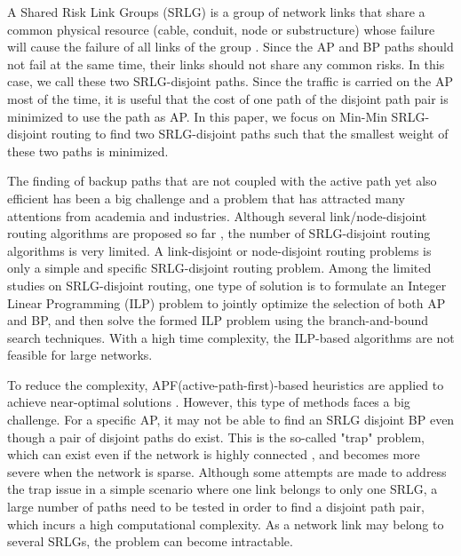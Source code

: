 A Shared Risk Link Groups (SRLG) is a group of network links that share a common physical resource (cable, conduit, node or substructure) whose failure will cause the failure of all links of the group \cite{sebos2001auto}.  Since the AP and BP paths should not fail at the same time, their links should not share any common risks. In this case, we call these two SRLG-disjoint paths. Since the traffic is carried on the AP most of the time, it is useful that the cost of one path of the disjoint path pair is minimized to use the  path as AP. In this paper, we focus on Min-Min SRLG-disjoint routing to find two SRLG-disjoint paths such that the smallest weight of these two paths is minimized.

The finding of backup paths that are not coupled with the active path yet also efficient has been a big challenge and a problem that has attracted many attentions from academia and industries. Although several link/node-disjoint routing algorithms are proposed so far \cite{suurballe1984quick,bhandari1997optimal,li1990complexity,guo2003link,xu2004finding,beshir2011variants,guo2013finding,hu2003diverse}, the number of SRLG-disjoint routing algorithms is very limited.  A link-disjoint or node-disjoint routing problems is only a simple and specific SRLG-disjoint routing problem. Among the limited studies on SRLG-disjoint routing, one type of solution is to formulate an Integer Linear Programming (ILP)\cite{hu2003diverse} problem to jointly optimize the selection of both AP and BP, and then solve the formed ILP problem using the branch-and-bound\cite{lawler1966branch} search techniques. With a high time complexity, the ILP-based algorithms are not feasible for large networks.

  To reduce the complexity, APF(active-path-first)-based heuristics are applied to achieve near-optimal solutions \cite{oki2002disjoint,li2002fiber,eppstein1998finding}. However, this type of methods faces a big challenge. For a specific AP, it may not be able to find an SRLG disjoint BP even though a pair of disjoint paths do exist. This is the so-called "trap" problem\cite{dunn1994comparison}, which can exist even if the network is highly connected \cite{laborczi2001solving}, and becomes more severe when the network is sparse. Although some attempts are made to address the trap issue in a simple scenario where  one link belongs to only one SRLG,  a large number of paths need to be tested in order to find a disjoint path pair, which incurs a high computational complexity. As a network link may belong to several SRLGs, the problem can become intractable.

